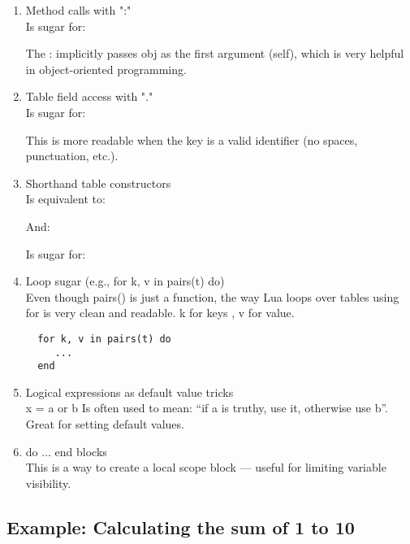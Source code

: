    \begin{enumerate}
  \item  Method calls with ":"\\
  Is sugar for: 

 The : implicitly passes obj as the first argument (self), which is very helpful in object-oriented programming.


  \item   Table field access with "."\\
    Is sugar for: 

  This is more readable when the key is a valid identifier (no spaces, punctuation, etc.).

  \item Shorthand table constructors\\
    Is equivalent to: 

  And:

   Is sugar for:  

  \item Loop sugar (e.g., for k, v in pairs(t) do)\\
  Even though pairs() is just a function, the way Lua loops over tables using for is very clean and readable. k for keys , v for value.

\begin{mybox}
\begin{verbatim}
  for k, v in pairs(t) do
     ...
  end
\end{verbatim}
\end{mybox}


 \item  Logical expressions as default value tricks\\
 x = a or b
 Is often used to mean: “if a is truthy, use it, otherwise use b”. Great for setting default values.

 \item  do ... end blocks\\
 This is a way to create a local scope block — useful for limiting variable visibility.
\end{enumerate}

\subsection{Example: Calculating the sum of 1 to 10} %
\label{sub:calculating_the_sum}

